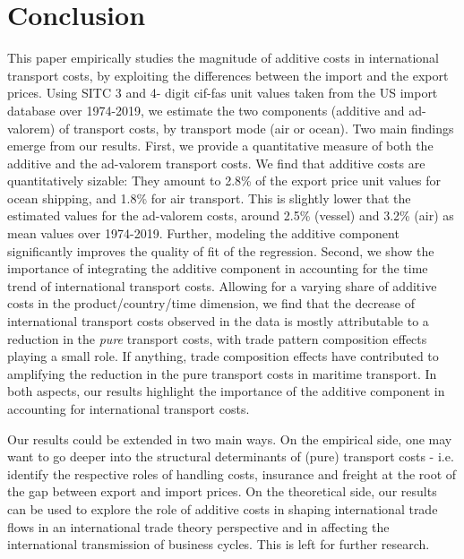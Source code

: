 \documentclass[a4paper,11pt]{article}
\begin{document}
\section{Conclusion \label{sec:conclu}}

This paper empirically studies the magnitude of additive costs in international transport costs, by exploiting the differences between the import and the export prices.
Using SITC 3 and 4- digit cif-fas unit values taken from the US import database over 1974-2019, we estimate the two components (additive and ad-valorem) of transport costs, by transport mode (air or ocean).
Two main findings emerge from our results.
First, we provide a quantitative measure of both the additive and the ad-valorem transport costs.
We find that additive costs are quantitatively sizable: They amount to 2.8\% of the export price unit values for ocean shipping, and 1.8\% for air transport.
This is slightly lower that the estimated values for the ad-valorem costs, around  2.5\% (vessel) and 3.2\% (air) as mean values over 1974-2019.
Further, modeling the additive component significantly improves the quality of fit of the regression.
Second, we show the importance of integrating the additive component in accounting for the time trend of international transport costs.
Allowing for a varying share of additive costs in the product/country/time dimension, we find that the decrease of international transport costs observed in the data is mostly attributable to a reduction in the \textit{pure} transport costs, with trade pattern composition effects playing a small role.
If anything, trade composition effects have contributed to amplifying the reduction in the pure transport costs in maritime transport.
In both aspects, our results highlight the importance of the additive component in accounting for international transport costs.

Our results could be extended in two main ways.
On the empirical side, one may want to go deeper into the structural determinants of (pure) transport costs - i.e.
identify the respective roles of handling costs, insurance and freight at the root of the gap between export and import prices.
On the theoretical side, our results can be used to explore the role of additive costs in shaping international trade flows in an international trade theory perspective and in affecting the international transmission of business cycles.
This is left for further research.



\newpage


\end{document}
